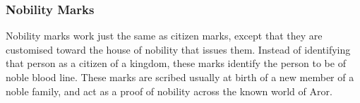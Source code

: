 \subsubsection{Nobility Marks}
\label{sec:Nobility Marks}

Nobility marks work just the same as citizen marks, except that they are
customised toward the house of nobility that issues them. Instead of
identifying that person as a citizen of a kingdom, these marks identify the
person to be of noble blood line. These marks are scribed usually at birth of
a new member of a noble family, and act as a proof of nobility across the
known world of Aror.
